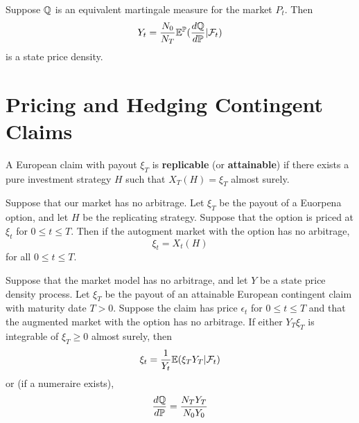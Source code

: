 \begin{defn}
  \label{sec:arbitrage-theory-22}
  Suppose $\Q$ is an equivalent martingale measure for the market
  $P_{t}$. Then
  \begin{equation}
    \label{eq:5}
    Y_{t} = \frac{N_{0}}{N_{T}}  \E^{\Prob}(\frac{d\Q}{d\Prob} | \mathcal{F}_{t})
  \end{equation} is a state price density.
\end{defn}

\section{Pricing and Hedging Contingent Claims}
\label{sec:pric-hedg-cont}

\begin{defn}
  \label{sec:pric-hedg-cont-1}
  A European claim with payout $\xi_{T}$ is \textbf{replicable} (or
  \textbf{attainable}) if there exists a pure investment strategy $H$
  such that $X_{T}(H) = \xi_{T}$ almost surely.
\end{defn}

\begin{thm}
  \label{sec:pric-hedg-cont-3}
  Suppose that our market has no arbitrage.  Let $\xi_{T}$ be the
  payout of a Euorpena option, and let $H$ be the replicating strategy.
  Suppose that the option is priced at $\xi_{t}$ for $0 \leq t \leq
  T$.  Then if the autogment market with the option has no arbitrage,
  \begin{equation}
    \label{eq:7}
    \xi_{t} = X_{t}(H)
  \end{equation} for all $0 \leq t \leq T$.
\end{thm}

\begin{thm}
  \label{sec:pric-hedg-cont-4}
  Suppose that the market model has no arbitrage, and let $Y$ be a
  state price density process. Let $\xi_{T}$ be the payout of an
  attainable European contingent claim with maturity date $T > 0$.
  Suppose the claim has price $\epsilon_{t}$ for $0 \leq t \leq T$ and
  that the augmented market with the option has no arbitrage.  If
  either $Y_{T} \xi_{T}$ is integrable of $\xi_{T} \geq 0$ almost
  surely, then
  \begin{align}
    \label{eq:8}
    \xi_{t} = \frac{1}{Y_{t}} \E{\xi_{T} Y_{T} | \mathcal{F}_{t}}
  \end{align} or (if a numeraire exists),
  \begin{align}
    \label{eq:9}
    \frac{d\Q}{d\Prob} = \frac{N_{T} Y_{T}}{N_{0} Y_{0}}
  \end{align}
\end{thm}

